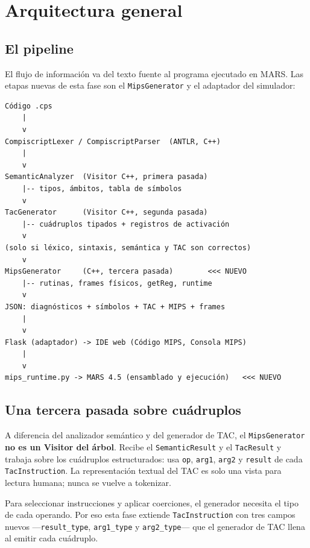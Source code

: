 \documentclass[11pt,a4paper]{article}
\begin{document}
\section{Arquitectura general}

\subsection{El pipeline}

El flujo de información va del texto fuente al programa ejecutado en MARS. Las
etapas nuevas de esta fase son el \texttt{MipsGenerator} y el adaptador del
simulador:

\begin{center}
\begin{minipage}{0.86\textwidth}
\ttfamily\small
\begin{verbatim}
Código .cps
    |
    v
CompiscriptLexer / CompiscriptParser  (ANTLR, C++)
    |
    v
SemanticAnalyzer  (Visitor C++, primera pasada)
    |-- tipos, ámbitos, tabla de símbolos
    v
TacGenerator      (Visitor C++, segunda pasada)
    |-- cuádruplos tipados + registros de activación
    v
(solo si léxico, sintaxis, semántica y TAC son correctos)
    v
MipsGenerator     (C++, tercera pasada)        <<< NUEVO
    |-- rutinas, frames físicos, getReg, runtime
    v
JSON: diagnósticos + símbolos + TAC + MIPS + frames
    |
    v
Flask (adaptador) -> IDE web (Código MIPS, Consola MIPS)
    |
    v
mips_runtime.py -> MARS 4.5 (ensamblado y ejecución)   <<< NUEVO
\end{verbatim}
\end{minipage}
\end{center}

\subsection{Una tercera pasada sobre cuádruplos}

A diferencia del analizador semántico y del generador de TAC, el
\texttt{MipsGenerator} \textbf{no es un Visitor del árbol}. Recibe el
\texttt{SemanticResult} y el \texttt{TacResult} y trabaja sobre los cuádruplos
estructurados: usa \texttt{op}, \texttt{arg1}, \texttt{arg2} y \texttt{result}
de cada \texttt{TacInstruction}. La representación textual del TAC es solo una
vista para lectura humana; nunca se vuelve a tokenizar.

Para seleccionar instrucciones y aplicar coerciones, el generador necesita el
tipo de cada operando. Por eso esta fase extiende \texttt{TacInstruction} con
tres campos nuevos ---\texttt{result\_type}, \texttt{arg1\_type} y
\texttt{arg2\_type}--- que el generador de TAC llena al emitir cada cuádruplo.
\end{document}
